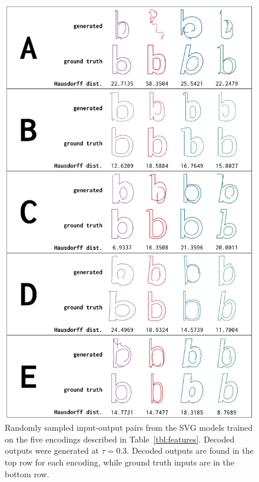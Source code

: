 \begin{figure}[t]
    \centering
	\includegraphics[height=0.8\textheight]{figures/encodings}
    \caption[Visual results of training the SVG model with different encodings]
    {Randomly sampled input-output pairs from the SVG models trained on the five encodings described in Table~\ref{tbl:features}.
    Decoded outputs were generated at $\tau = 0.3$.
    Decoded outputs are found in the top row for each encoding, while ground truth inputs are in the bottom row.\label{fig:encodings}}
\end{figure}

